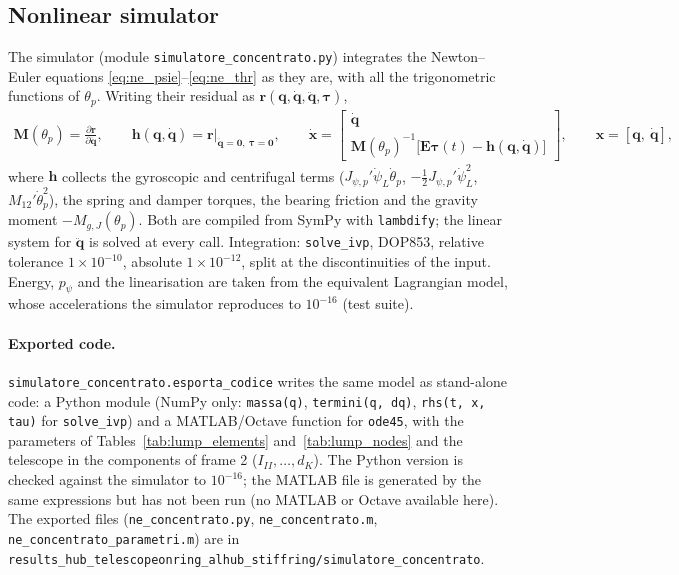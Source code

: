 \documentclass[10pt,a4paper]{article}
\numberwithin{equation}{section}
\begin{document}
\subsection{Nonlinear simulator}\label{subsec:lump_sim}
The simulator (module \texttt{simulatore\_concentrato.py}) integrates the Newton--Euler equations \eqref{eq:ne_psie}--\eqref{eq:ne_thr} as they are, with all the trigonometric functions of $\theta_p$. Writing their residual as $\mathbf r(\mathbf q, \dot{\mathbf q}, \ddot{\mathbf q}, \boldsymbol\tau)$,
\begin{gather}
\mathbf M(\theta_p) = \frac{\partial\mathbf r}{\partial\ddot{\mathbf q}},\qquad \mathbf h(\mathbf q, \dot{\mathbf q}) = \mathbf r\big|_{\ddot{\mathbf q} = \mathbf 0,\ \boldsymbol\tau = \mathbf 0},\qquad \dot{\mathbf x} = \begin{bmatrix}\dot{\mathbf q}\\ \mathbf M(\theta_p)^{-1}\bigl[\mathbf E\boldsymbol\tau(t) - \mathbf h(\mathbf q, \dot{\mathbf q})\bigr]\end{bmatrix},\qquad \mathbf x = [\mathbf q,\ \dot{\mathbf q}],
\end{gather}
where $\mathbf h$ collects the gyroscopic and centrifugal terms ($J_{\psi,p}'\dot\psi_L\dot\theta_p$, $-\tfrac12 J_{\psi,p}'\dot\psi_L^2$, $M_{12}'\dot\theta_p^2$), the spring and damper torques, the bearing friction and the gravity moment $-M_{g,J}(\theta_p)$. Both are compiled from SymPy with \texttt{lambdify}; the linear system for $\ddot{\mathbf q}$ is solved at every call. Integration: \texttt{solve\_ivp}, DOP853, relative tolerance $1\times10^{-10}$, absolute $1\times10^{-12}$, split at the discontinuities of the input. Energy, $p_\psi$ and the linearisation are taken from the equivalent Lagrangian model, whose accelerations the simulator reproduces to $10^{-16}$ (test suite).
\paragraph{Exported code.} \texttt{simulatore\_concentrato.esporta\_codice} writes the same model as stand-alone code: a Python module (NumPy only: \texttt{massa(q)}, \texttt{termini(q, dq)}, \texttt{rhs(t, x, tau)} for \texttt{solve\_ivp}) and a MATLAB/Octave function for \texttt{ode45}, with the parameters of Tables~\ref{tab:lump_elements} and~\ref{tab:lump_nodes} and the telescope in the components of frame 2 ($I_{II}, \dots, d_K$). The Python version is checked against the simulator to $10^{-16}$; the MATLAB file is generated by the same expressions but has not been run (no MATLAB or Octave available here). The exported files (\texttt{ne\_concentrato.py}, \texttt{ne\_concentrato.m}, \texttt{ne\_concentrato\_parametri.m}) are in \texttt{results\_hub\_telescopeonring\_alhub\_stiffring/simulatore\_concentrato}.
\end{document}
